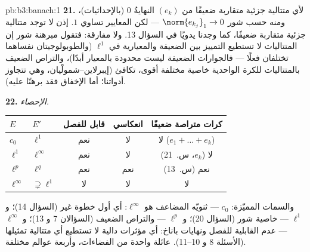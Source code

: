 \begin{solution}{pb:b3:banach:1}
\textbf{21.} لأي متتالية جزئية متقاربة ضعيفًا من $(e_k)$
النهايةُ $0$ (بالإحداثيات)، ومنه حسب شور $\norm{e_{k_j}}_1
\to 0$ --- لكن
المعايير تساوي $1$. إذن لا توجد متتالية جزئية متقاربة ضعيفًا،
كما وجدنا يدويًا في السؤال 13. ولا مفارقة: فتقول مبرهنة شور
إن المتتاليات لا تستطيع التمييز بين  الضعيفة
والمعيارية في $\ell^1$ (والطوبولوجيتان نفساهما تختلفان فعلًا ---
فالجوارات الضعيفة ليست محدودة بالمعيار أبدًا)، والتراص الضعيف
بالمتتاليات للكرة الواحدية خاصية مختلفة أقوى، تكافئ 
(إيبرلاين--شمولْيان، وهي تتجاوز أدواتنا؛ أما الإخفاق فقد
برهنّا عليه).

\textbf{22.} \emph{الإحصاء.}
\begin{center}
\begin{tabular}{l|l|c|c|c}
$E$ & $E'$ & قابل للفصل & انعكاسي & كرات متراصة ضعيفًا\\
\hline
$c_0$ & $\ell^1$ & نعم & لا & لا ($e_1{+}\dots{+}e_k$)\\
$\ell^1$ & $\ell^\infty$ & نعم & لا & لا ($e_k$، س.~21)\\
$\ell^p$ & $\ell^q$ & نعم & نعم & نعم (س.~13)\\
$\ell^\infty$ & $\supsetneq\ell^1$ & لا & لا & لا\\
\end{tabular}
\end{center}
والسمات المميّزة: $c_0$ --- ثنويّه المضاعف هو $\ell^\infty$:
أي أول خطوة غير  (السؤال 14)؛ و $\ell^1$ --- خاصية شور
(السؤال 20)؛ و $\ell^p$ ---  والتراص الضعيف
(السؤالان 7 و 13)؛ و $\ell^\infty$ --- عدم القابلية للفصل
ونهايات باناخ: أي مؤثرات دالية لا تستطيع أي متتالية تمثيلها
(الأسئلة 8 و 10--11). عائلة واحدة من الفضاءات، وأربعة عوالم
مختلفة.


\end{solution}
